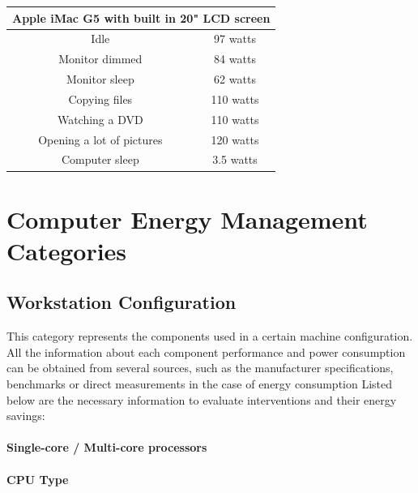     \begin{table}
        \centering
        \begin{tabular}{|c|c|}
        \hline
        \multicolumn{ 2}{|c|}{{\bf Apple iMac G5 with built in 20" LCD screen}} \\
        \hline
              Idle &   97 watts \\
        \hline
        Monitor dimmed &   84 watts \\
        \hline
        Monitor sleep &   62 watts \\
        \hline
        Copying files &  110 watts \\
        \hline
        Watching a DVD &  110 watts \\
        \hline
        Opening a lot of pictures &  120 watts \\
        \hline
        Computer sleep &  3.5 watts \\
        \hline
        \end{tabular}  
        \label{tab:energy_used_apple_20}
    \end{table}
    
    \section{Computer Energy Management Categories} \label{sec2:energy_categories}
    
    \subsection{Workstation Configuration}\label{sec2:workstation_configuration}
        This category represents the components used in a certain machine configuration. All the information about each component performance and power consumption can be obtained from several sources, such as the manufacturer specifications, benchmarks or direct measurements in the case of energy consumption
        Listed below are the necessary information to evaluate interventions and their energy savings:
            \paragraph*{Single-core / Multi-core processors}
            \paragraph*{CPU Type}
